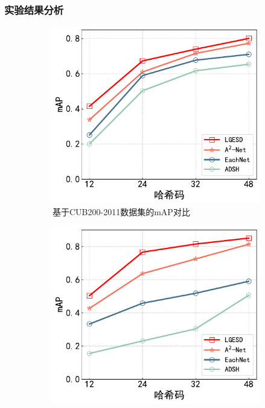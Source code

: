 \subsubsection{实验结果分析}

\begin{figure}[h]
  \centering
  \begin{subfigure}{0.48\textwidth}
    \centering
    \includegraphics[width=\linewidth]{./Img/CUB-R50.pdf}
    \caption{基于CUB200-2011数据集的mAP对比}\label{fig:4-29}
  \end{subfigure}
  \hfil
  \begin{subfigure}{0.48\textwidth}
    \centering
    \includegraphics[width=\linewidth]{./Img/Aircraft-R50.pdf}

\end{subfigure}
\end{figure}
